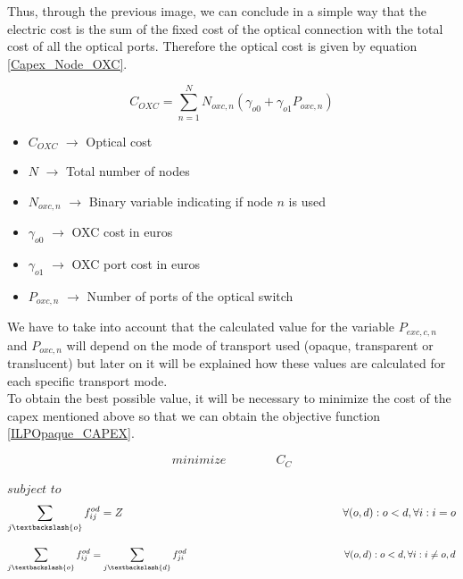 Thus, through the previous image, we can conclude in a simple way that the electric cost is the sum of the fixed cost of the optical connection with the total cost of all the optical ports.
Therefore the optical cost is given by equation \ref{Capex_Node_OXC}.

\begin{equation}
C_{OXC} = \sum_{n=1}^{N} N_{oxc,n} \left( \gamma_{o0} + \gamma_{o1} P_{oxc,n} \right)
\label{Capex_Node_OXC}
\end{equation}

\begin{itemize}
\item{$C_{OXC}$			$\rightarrow$	Optical cost}
\item{$N$				$\rightarrow$	Total number of nodes}
\item{$N_{oxc,n}$		$\rightarrow$	Binary variable indicating if node $n$ is used}
\item{$\gamma_{o0}$ 	$\rightarrow$	OXC cost in euros}
\item{$\gamma_{o1}$ 	$\rightarrow$	OXC port cost in euros }
\item{$P_{oxc,n}$	    $\rightarrow$	Number of ports of the optical switch}
\end{itemize}


\vspace{10pt}
We have to take into account that the calculated value for the variable $P_{exc,c,n}$ and $P_{oxc,n}$ will depend on the mode of transport used (opaque, transparent or translucent) but later on it will be explained how these values are calculated for each specific transport mode.\\
To obtain the best possible value, it will be necessary to minimize the cost of the capex mentioned above so that we can obtain the objective function \ref{ILPOpaque_CAPEX}.

\begin{equation}
minimize \qquad \qquad C_C
\label{ILPOpaque_CAPEX}
\end{equation}

$subject$ $to$
\begin{equation}
\sum_{j\textbackslash \{o\}} f_{ij}^{od} = Z  \qquad \qquad \qquad \qquad \qquad \qquad \qquad \qquad \qquad \qquad
\forall(o,d) : o < d, \forall i: i = o
\label{ILPOpaque1_CAPEX}
\end{equation}

\begin{equation}
\sum_{j\textbackslash \{o\}} f_{ij}^{od} = \sum_{j\textbackslash \{d\}} f_{ji}^{od}   \qquad \qquad \qquad \qquad \qquad \qquad \qquad \qquad
\forall(o,d) : o < d, \forall i: i \neq o,d
\label{ILPOpaque2_CAPEX}
\end{equation}

